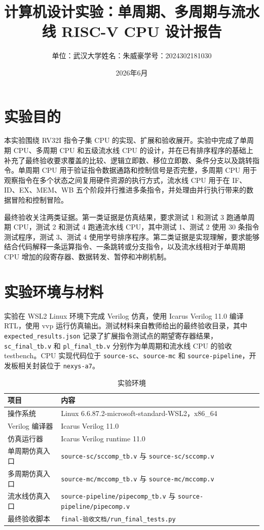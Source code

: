 \documentclass[UTF8,a4paper,12pt]{ctexart}
\title{计算机设计实验：单周期、多周期与流水线 RISC-V CPU 设计报告}
\author{单位：武汉大学\quad 姓名：朱威豪\quad 学号：2024302181030}
\date{2026年6月}
\begin{document}
\maketitle

\section{实验目的}

本实验围绕 RV32I 指令子集 CPU 的实现、扩展和验收展开。实验中完成了单周期 CPU、多周期 CPU 和五级流水线 CPU 的设计，并在已有排序程序的基础上补充了最终验收要求覆盖的比较、逻辑立即数、移位立即数、条件分支以及跳转指令。单周期 CPU 用于验证指令数据通路和控制信号是否完整，多周期 CPU 用于观察指令在多个状态之间复用硬件资源的执行方式，流水线 CPU 用于在 IF、ID、EX、MEM、WB 五个阶段并行推进多条指令，并处理由并行执行带来的数据冒险和控制冒险。

最终验收关注两类证据。第一类证据是仿真结果，要求测试 1 和测试 3 跑通单周期 CPU，测试 2 和测试 4 跑通流水线 CPU，其中测试 1、测试 2 使用 30 条指令测试程序，测试 3、测试 4 使用学号排序程序。第二类证据是实现理解，要求能够结合代码解释一条运算指令、一条跳转或分支指令，以及流水线相对于单周期 CPU 增加的段寄存器、数据转发、暂停和冲刷机制。

\section{实验环境与材料}

实验在 WSL2 Linux 环境下完成 Verilog 仿真，使用 Icarus Verilog 11.0 编译 RTL，使用 vvp 运行仿真输出。测试材料来自教师给出的最终验收目录，其中 \texttt{expected\_results.json} 记录了扩展指令测试点的期望寄存器结果，\texttt{sc\_final\_tb.v} 和 \texttt{pl\_final\_tb.v} 分别作为单周期和流水线 CPU 的验收 testbench。CPU 实现代码位于 \texttt{source-sc}、\texttt{source-mc} 和 \texttt{source-pipeline}，开发板相关封装位于 \texttt{nexys-a7}。

\begin{table}[H]
\centering
\caption{实验环境}
\begin{tabular}{ll}
\toprule
项目 & 内容 \\
\midrule
操作系统 & Linux 6.6.87.2-microsoft-standard-WSL2，x86\_64 \\
Verilog 编译器 & Icarus Verilog 11.0 \\
仿真运行器 & Icarus Verilog runtime 11.0 \\
单周期仿真入口 & \texttt{source-sc/sccomp\_tb.v} 与 \texttt{source-sc/sccomp.v} \\
多周期仿真入口 & \texttt{source-mc/mccomp\_tb.v} 与 \texttt{source-mc/mccomp.v} \\
流水线仿真入口 & \texttt{source-pipeline/pipecomp\_tb.v} 与 \texttt{source-pipeline/pipecomp.v} \\
最终验收脚本 & \texttt{final-验收文档/run\_final\_tests.py} \\
\bottomrule
\end{tabular}
\end{table}
\end{document}
